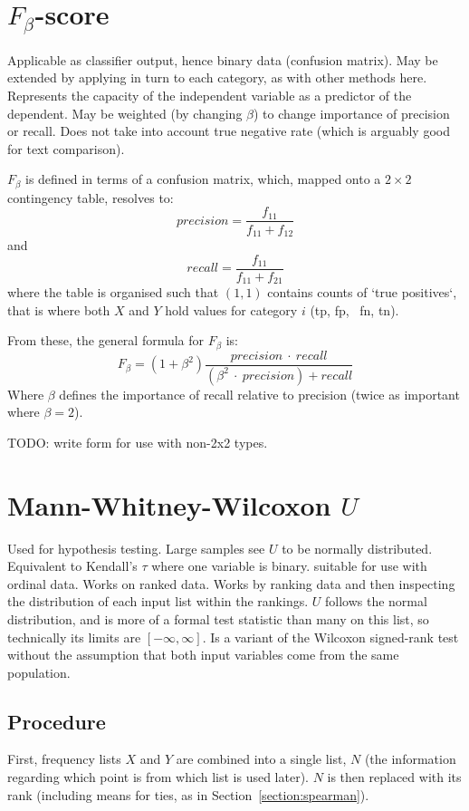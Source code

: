 \documentclass[11pt]{article}
\begin{document}
\section{$F_\beta$-score}
Applicable as classifier output, hence binary data (confusion matrix).  May be extended by applying in turn to each category, as with other methods here.  Represents the capacity of the independent variable as a predictor of the dependent.  May be weighted (by changing $\beta$) to change importance of precision or recall.  Does not take into account true negative rate (which is arguably good for text comparison).

$F_\beta$ is defined in terms of a confusion matrix, which, mapped onto a $2\times 2$ contingency table, resolves to:
$$
precision = \frac{ f_{11} }{ f_{11} + f_{12} }
$$
and
$$
recall = \frac{ f_{11} }{ f_{11} + f_{21} }
$$
where the table is organised such that $(1,1)$ contains counts of `true positives`, that is where both $X$ and $Y$ hold values for category $i$ (tp, fp, \ fn, tn).

From these, the general formula for $F_\beta$ is:
$$
F_\beta = (1 + \beta^2) \frac{ precision ~\cdot~ recall }{ (\beta^2 ~ \cdot ~ precision) + recall }
$$
Where $\beta$ defines the importance of recall relative to precision (twice as important where $\beta = 2$).

TODO: write form for use with non-2x2 types.





\section{Mann-Whitney-Wilcoxon $U$}
Used for hypothesis testing.  Large samples see $U$ to be normally distributed.  Equivalent to Kendall's $\tau$ where one variable is binary.  suitable for use with ordinal data.  Works on ranked data.  Works by ranking data and then inspecting the distribution of each input list within the rankings.  $U$ follows the normal distribution, and is more of a formal test statistic than many on this list, so technically its limits are $[-\infty, \infty]$.  Is a variant of the Wilcoxon signed-rank test without the assumption that both input variables come from the same population.

\subsection{Procedure}
First, frequency lists $X$ and $Y$ are combined into a single list, $N$ (the information regarding which point is from which list is used later).  $N$ is then replaced with its rank (including means for ties, as in Section~\ref{section:spearman}).
\end{document}
